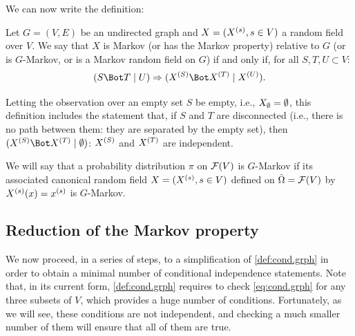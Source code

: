   
  
We can now write the definition: 
\begin{definition}
\label{def:cond.grph}
Let $G = (V,E)$ be an undirected graph and  $X = (X^{(s)}, s\in V)$ a
random field over $V$. We say that $X$ is Markov (or
has the Markov property) relative to  $G$ (or is $G$-Markov, or is a
Markov random field on $G$) if and only if, for all $S, T, U \subset V$:
\begin{equation}
\label{eq:cond.grph}
\cind{S}{T}{U} \Rightarrow \cind{\pe X S}{\pe X T}{\pe X U}.
\end{equation}
\end{definition}
Letting the observation over an empty set $S$ be empty, i.e., $X_\emptyset =
\emptyset$, this definition includes the statement that, if $S$ and $T$ are
disconnected (i.e., there is no path between them: they are
separated by the empty set), then $\cind{\pe XS}{\pe XT}{\emp}$: $X^{(S)}$
and $X^{(T)}$ are independent. 

We will say that a probability distribution $\pi$ on ${\mathcal F}(V)$ is $G$-Markov if its associated canonical random field $X = (X^{(s)}, s\in V)$ defined on $\tilde \Omega = {\mathcal F}(V)$ by $X^{(s)} (x) = x^{(s)}$ is  $G$-Markov.


\subsection{Reduction of the Markov property}

We now proceed, in a series of steps, to a simplification of
 \cref{def:cond.grph} in order to obtain a minimal number of conditional
independence statements. Note that, in its current form, 
\cref{def:cond.grph} requires to check \cref{eq:cond.grph} for any
three subsets of $V$, which provides a huge number of conditions. Fortunately, as we will see, these conditions are not independent, and checking a much smaller number of them will ensure that all of them are true. 

